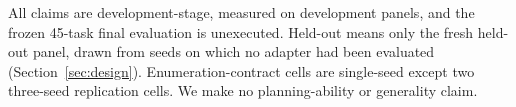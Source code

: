 All claims are development-stage, measured on development panels, and the frozen 45-task final evaluation is unexecuted.
Held-out means only the fresh held-out panel, drawn from seeds on which no adapter had been evaluated (Section~\ref{sec:design}).
Enumeration-contract cells are single-seed except two three-seed replication cells.
We make no planning-ability or generality claim.
